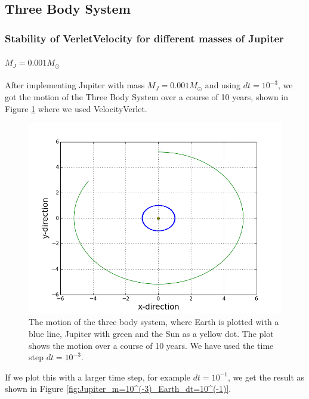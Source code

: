 \documentclass[norsk,a4paper,12pt]{article}
\begin{document}
{\subsection{Three Body System}

\subsubsection{Stability of VerletVelocity for different masses of Jupiter}

\paragraph{\textbf{$M_J = 0.001M_{\odot}$}}

After implementing Jupiter with mass $M_J = 0.001M_{\odot}$ and using $dt = 10^{-3}$, we got the motion of the Three Body System over a course of 10 years, shown in Figure \ref{fig:Jupiter_m=10^(-3)_Earth_dt=10^(-3)} where we used VelocityVerlet.
\begin{figure} [H]
    \centering
    \includegraphics[scale=0.6]{oppg_3e_threebody_Jupiter_m=10_(-3)_Earth}
    \caption{The motion of the three body system, where Earth is plotted with a blue line, Jupiter with green and the Sun as a yellow dot. The plot shows the motion over a course of 10 years. We have used the time step $dt = 10^{-3}$.}
    \label{fig:Jupiter_m=10^(-3)_Earth_dt=10^(-3)}
\end{figure}

If we plot this with a larger time step, for example $dt = 10^{-1}$, we get the result as shown in Figure \ref{fig:Jupiter_m=10^(-3)_Earth_dt=10^(-1)}.

}
\end{document}
